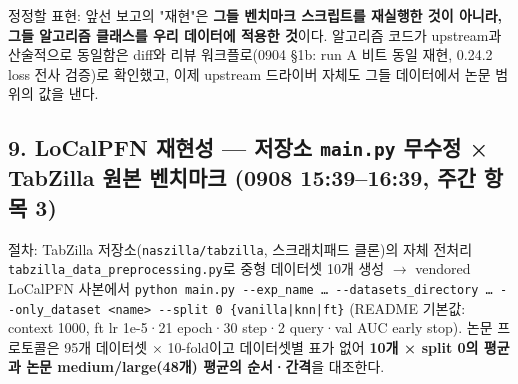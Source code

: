 \par\noindent \textbullet\enspace 정정할 표현: 앞선 보고의 "재현"은 \textbf{그들 벤치마크 스크립트를 재실행한 것이 아니라, 그들 알고리즘 클래스를 우리 데이터에 적용한 것}이다. 알고리즘 코드가 upstream과 산술적으로 동일함은 diff와 리뷰 워크플로(0904 §1b: run A 비트 동일 재현, 0.24.2 loss 전사 검증)로 확인했고, 이제 upstream 드라이버 자체도 그들 데이터에서 논문 범위의 값을 낸다.


\subsection{9. LoCalPFN 재현성 — 저장소 \texttt{main.\allowbreak{}py} 무수정 × TabZilla 원본 벤치마크 (0908 15:39–16:39, 주간 항목 3)}
\par\noindent \textbullet\enspace 절차: TabZilla 저장소(\texttt{naszilla\allowbreak{}/\allowbreak{}\allowbreak{}tabzill\allowbreak{}a}, 스크래치패드 클론)의 자체 전처리 \texttt{tabzilla\allowbreak{}\_\allowbreak{}\allowbreak{}data\_\allowbreak{}\allowbreak{}pr\allowbreak{}eprocess\allowbreak{}ing.\allowbreak{}py}로 중형 데이터셋 10개 생성  \ensuremath{\rightarrow}  vendored LoCalPFN 사본에서 \texttt{python m\allowbreak{}ain.\allowbreak{}py -\allowbreak{}-\allowbreak{}exp\_\allowbreak{}\allowbreak{}nam\allowbreak{}e … -\allowbreak{}-\allowbreak{}da\allowbreak{}tasets\_\allowbreak{}\allowbreak{}d\allowbreak{}irectory\allowbreak{} … -\allowbreak{}-\allowbreak{}onl\allowbreak{}y\_\allowbreak{}\allowbreak{}datase\allowbreak{}t <name>\allowbreak{} -\allowbreak{}-\allowbreak{}split\allowbreak{} 0 \{\allowbreak{}vani\allowbreak{}lla|knn|\allowbreak{}ft\}\allowbreak{}} (README 기본값: context 1000, ft lr 1e-5·21 epoch·30 step·2 query·val AUC early stop). 논문 프로토콜은 95개 데이터셋 × 10-fold이고 데이터셋별 표가 없어 \textbf{10개 × split 0의 평균과 논문 medium/\allowbreak{}large(48개) 평균의 순서·간격}을 대조한다.


